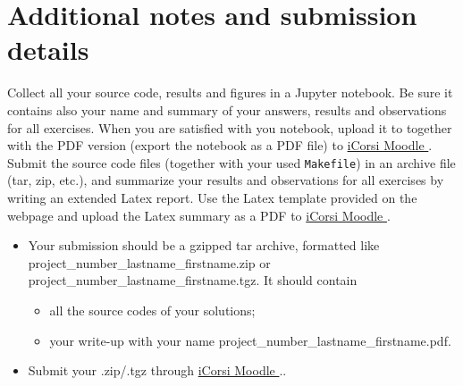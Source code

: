 \documentclass[unicode,11pt,a4paper,oneside,numbers=endperiod,openany]{scrartcl}
\newcommand{\usieth}[2]
{
	\ifusi #1 \fi
	\ifeth #2 \fi
}
\begin{document}
\section*{Additional notes and submission details}
Collect all your source code, results and figures in a Jupyter notebook. Be sure it contains also your name and summary of your answers, results and observations for all exercises. When you are satisfied with you notebook, upload it to together with the PDF version (export the notebook as a PDF file) to \href{https://www.icorsi.ch/course/view.php?id=10049}{\usieth{iCorsi}{Moodle}}.
Submit the source code files (together with your used \texttt{Makefile}) in
an archive file (tar, zip, etc.), and summarize your results and
observations for all exercises by writing an extended Latex report.
Use the Latex template provided on the webpage and upload the Latex summary
as a PDF to \href{https://www.icorsi.ch/course/view.php?id=10049}{\usieth{iCorsi}{Moodle}}.

\begin{itemize}
	\item Your submission should be a gzipped tar archive, formatted like project\_number\_lastname\_firstname.zip or project\_number\_lastname\_firstname.tgz. 
	It should contain
	\begin{itemize}
		\item all the source codes of your solutions;
		\item your write-up with your name  project\_number\_lastname\_firstname.pdf.
	\end{itemize}
	\item Submit your .zip/.tgz through \href{https://www.icorsi.ch/course/view.php?id=10049}{\usieth{iCorsi}{Moodle}}..
\end{itemize}
\end{document}
